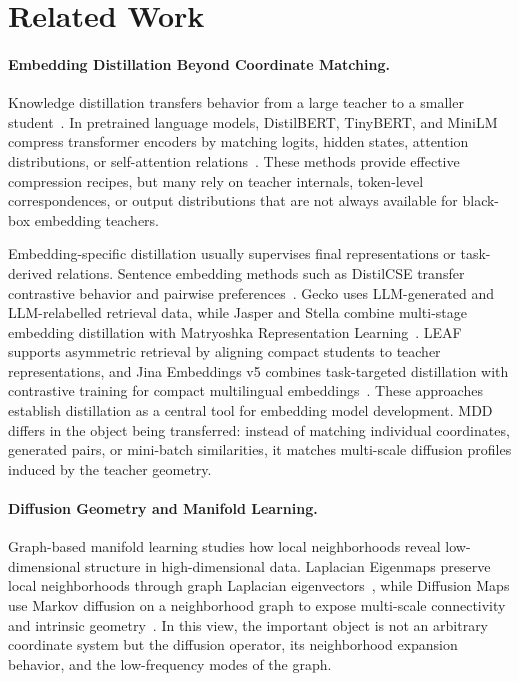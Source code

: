 \section{Related Work}

\paragraph{Embedding Distillation Beyond Coordinate Matching.}
Knowledge distillation transfers behavior from a large teacher to a smaller student~\citep{hinton2015distilling}. In pretrained language models, DistilBERT, TinyBERT, and MiniLM compress transformer encoders by matching logits, hidden states, attention distributions, or self-attention relations~\citep{sanh2019distilbert,jiao2019tinybert,wang2020minilm,xu2024survey}. These methods provide effective compression recipes, but many rely on teacher internals, token-level correspondences, or output distributions that are not always available for black-box embedding teachers.

Embedding-specific distillation usually supervises final representations or task-derived relations. Sentence embedding methods such as DistilCSE transfer contrastive behavior and pairwise preferences~\citep{gao2021distilcse,xu2023distillcse}. Gecko uses LLM-generated and LLM-relabelled retrieval data, while Jasper and Stella combine multi-stage embedding distillation with Matryoshka Representation Learning~\citep{lee2024gecko,zhang2024jasperstella}. LEAF supports asymmetric retrieval by aligning compact students to teacher representations, and Jina Embeddings v5 combines task-targeted distillation with contrastive training for compact multilingual embeddings~\citep{vujanic2025leaf,akram2026jinaembeddingsv5}. These approaches establish distillation as a central tool for embedding model development. MDD differs in the object being transferred: instead of matching individual coordinates, generated pairs, or mini-batch similarities, it matches multi-scale diffusion profiles induced by the teacher geometry.

\paragraph{Diffusion Geometry and Manifold Learning.}
Graph-based manifold learning studies how local neighborhoods reveal low-dimensional structure in high-dimensional data. Laplacian Eigenmaps preserve local neighborhoods through graph Laplacian eigenvectors~\citep{belkin2003laplacian}, while Diffusion Maps use Markov diffusion on a neighborhood graph to expose multi-scale connectivity and intrinsic geometry~\citep{coifman2006diffusionmaps}. In this view, the important object is not an arbitrary coordinate system but the diffusion operator, its neighborhood expansion behavior, and the low-frequency modes of the graph.

